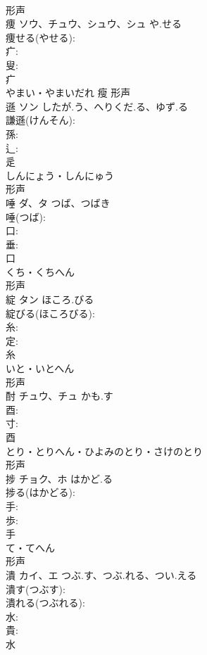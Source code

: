 \documentclass[8pt]{extreport}
\begin{document}
\begin{CJK}{UTF8}{min}
\\	形声 
\\	痩	ソウ、チュウ、シュウ、シュ	や.せる		
\\	痩せる(やせる): 
\\	疒: 
\\	叟: 
\\	疒	
\\	やまい・やまいだれ	瘦	形声 
\\	遜	ソン	したが.う、へりくだ.る、ゆず.る		
\\	謙遜(けんそん): 
\\	孫: 
\\	辶: 
\\	辵	
\\	しんにょう・しんにゅう	
\\	形声 
\\	唾	ダ、タ	つば、つばき		
\\	唾(つば): 
\\	口: 
\\	垂: 
\\	口	
\\	くち・くちへん	
\\	形声 
\\	綻	タン	ほころ.びる		
\\	綻びる(ほころびる): 
\\	糸: 
\\	定: 
\\	糸	
\\	いと・いとへん	
\\	形声 
\\	酎	チュウ、チュ	かも.す		
\\	酉: 
\\	寸: 
\\	酉	
\\	とり・とりへん・ひよみのとり・さけのとり	
\\	形声 
\\	捗	チョク、ホ	はかど.る		
\\	捗る(はかどる): 
\\	手: 
\\	歩: 
\\	手	
\\	て・てへん	
\\	形声 
\\	潰	カイ、エ	つぶ.す、つぶ.れる、つい.える		
\\	潰す(つぶす): 
\\	潰れる(つぶれる): 
\\	水: 
\\	貴: 
\\	水	

\end{CJK}
\end{document}
